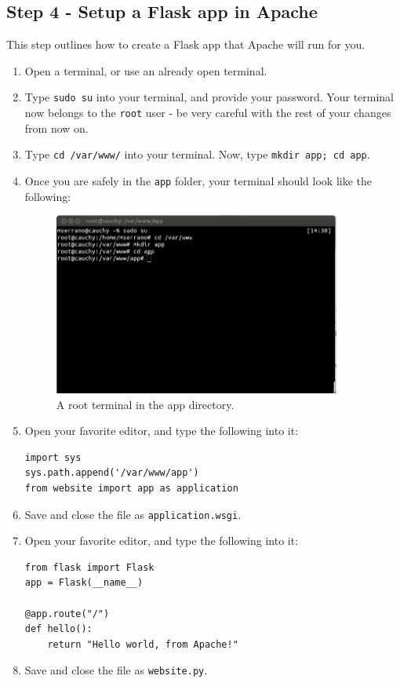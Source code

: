 \documentclass{article}
\begin{document}
\subsection{Step 4 - Setup a Flask app in Apache}
This step outlines how to create a Flask app that Apache will run for you.
\begin{enumerate}
\item Open a terminal, or use an already open terminal.
\item Type \verb+sudo su+ into your terminal, and provide your password. Your terminal
now belongs to the \verb+root+ user - be very careful with the rest of your changes
from now on.
\item Type \verb+cd /var/www/+ into your terminal. Now, type \verb+mkdir app; cd app+.
\item Once you are safely in the \verb+app+ folder, your terminal should look like the following:

\begin{figure}[h!]
\centering \includegraphics[height=6cm]{pic4.png} \caption{A root terminal in the app directory.}
\end{figure}

\item Open your favorite editor, and type the following into it:
\begin{verbatim}
import sys
sys.path.append('/var/www/app')
from website import app as application
\end{verbatim}
\item Save and close the file as \verb+application.wsgi+.
\item Open your favorite editor, and type the following into it:
\begin{verbatim}
from flask import Flask
app = Flask(__name__)

@app.route("/")
def hello():
    return "Hello world, from Apache!"
\end{verbatim}
\item Save and close the file as \verb+website.py+.
\end{enumerate}
\end{document}
